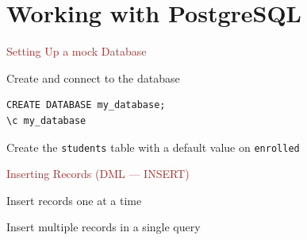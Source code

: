 \section{Working with PostgreSQL}

\begin{frame}[fragile]{\textcolor{brown}{Setting Up a mock Database}}
\begin{block}{Create and connect to the database}
\begin{lstlisting}[style=sql]
CREATE DATABASE my_database;
\c my_database
\end{lstlisting}

\end{block}

\begin{block}{Create the \texttt{students} table with a default value on \texttt{enrolled}}


\end{block}

\end{frame}

\begin{frame}[fragile]{\textcolor{brown}{Inserting Records (DML — INSERT)}}
\begin{block}{Insert records one at a time}


\end{block}

\begin{block}{Insert multiple records in a single query}

\end{block}

\end{frame}

